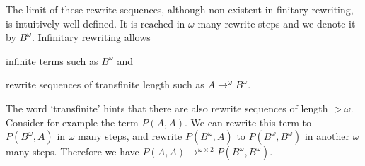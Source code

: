 The limit of these rewrite sequences, although non-existent in
finitary rewriting, is intuitively well-defined. It is reached in
$\omega$ many rewrite steps and we denote it by $B^\omega$. Infinitary
rewriting allows \begin{inparaenum}[(i)]
  \item infinite terms such as $B^\omega$ and
  \item rewrite sequences of transfinite length such as $A
    \rightarrow^\omega B^\omega$.
\end{inparaenum}%
\begin{center}
{\footnotesize{}}
\end{center}\vspace{-0.8\baselineskip}
The word `transfinite' hints that there are also rewrite sequences of
length $> \omega$. Consider for example the term $P(A, A)$. We can
rewrite this term to $P(B^\omega, A)$ in $\omega$ many steps, and
rewrite $P(B^\omega, A)$ to $P(B^\omega, B^\omega)$ in another
$\omega$ many steps. Therefore we have $P(A, A) \rightarrow^{\omega
  \times 2} P(B^\omega, B^\omega)$.
